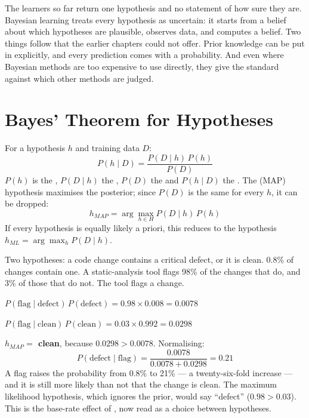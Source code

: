 The learners so far return one hypothesis and no statement of how sure they are.
Bayesian learning treats every hypothesis as uncertain: it starts from a
 belief about which hypotheses are plausible, observes data, and
computes a  belief. Two things follow that the earlier chapters
could not offer. Prior knowledge can be put in explicitly, and every prediction
comes with a probability. And even where Bayesian methods are too expensive to
use directly, they give the standard against which other methods are judged.

\section{Bayes' Theorem for Hypotheses}

\begin{definitionbox}
For a hypothesis $h$ and training data $D$:
\[
P(h \mid D) = \frac{P(D \mid h)\,P(h)}{P(D)}
\]
$P(h)$ is the , $P(D \mid h)$ the , $P(D)$ the
 and $P(h \mid D)$ the . The  (MAP) hypothesis maximises the posterior; since $P(D)$ is the same for
every $h$, it can be dropped:
\[
h_{MAP} = \arg\max_{h \in H} P(D \mid h)\,P(h)
\]
If every hypothesis is equally likely a priori, this reduces to the  hypothesis $h_{ML} = \arg\max_h P(D \mid h)$.
\end{definitionbox}

\begin{worked}
Two hypotheses: a code change contains a critical defect, or it is clean. 0.8\% of
changes contain one. A static-analysis tool flags 98\% of the changes that do, and
3\% of those that do not. The tool flags a change.

\smallskip
\begin{tight}
  \item $P(\text{flag} \mid \text{defect})\,P(\text{defect}) = 0.98 \times 0.008 = 0.0078$
  \item $P(\text{flag} \mid \text{clean})\,P(\text{clean}) = 0.03 \times 0.992 = 0.0298$
\end{tight}
\textbf{$h_{MAP} =$ clean}, because $0.0298 > 0.0078$. Normalising:
\[
P(\text{defect} \mid \text{flag}) = \frac{0.0078}{0.0078 + 0.0298} = \mathbf{0.21}
\]
A flag raises the probability from 0.8\% to 21\% --- a twenty-six-fold increase
--- and it is still more likely than not that the change is clean. The maximum
likelihood hypothesis, which ignores the prior, would say ``defect''
($0.98 > 0.03$). This is the base-rate effect of , now read as a choice
between hypotheses.
\end{worked}

